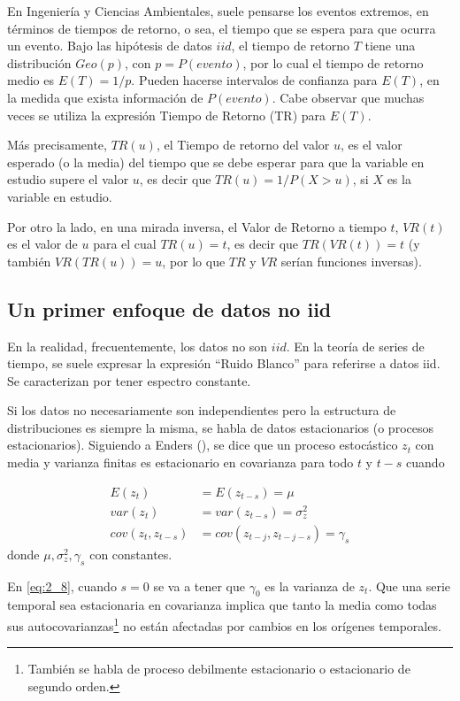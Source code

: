 \documentclass[
  12pt]{article}
\begin{document}
En Ingeniería y Ciencias Ambientales, suele pensarse los eventos
extremos, en términos de tiempos de retorno, o sea, el tiempo que se
espera para que ocurra un evento. Bajo las hipótesis de datos \(iid\),
el tiempo de retorno \(T\) tiene una distribución \(Geo(p)\), con
\(p = P(evento)\), por lo cual el tiempo de retorno medio es
\(E(T)=1/p\). Pueden hacerse intervalos de confianza para \(E(T)\), en
la medida que exista información de \(P(evento)\). Cabe observar que
muchas veces se utiliza la expresión Tiempo de Retorno (TR) para
\(E(T)\).

Más precisamente, \(TR(u)\), el Tiempo de retorno del valor \(u\), es el
valor esperado (o la media) del tiempo que se debe esperar para que la
variable en estudio supere el valor \(u\), es decir que
\(TR(u) = 1/P(X>u)\), si \(X\) es la variable en estudio.

Por otro la lado, en una mirada inversa, el Valor de Retorno a tiempo
\(t\), \(VR(t)\) es el valor de \(u\) para el cual \(TR(u)=t\), es decir
que \(TR(VR(t))=t\) (y también \(VR(TR(u))=u\), por lo que \(TR\) y
\(VR\) serían funciones inversas).

\subsection{Un primer enfoque de datos no
iid}\label{un-primer-enfoque-de-datos-no-iid}

En la realidad, frecuentemente, los datos no son \(iid\). En la teoría
de series de tiempo, se suele expresar la expresión ``Ruido Blanco''
para referirse a datos iid. Se caracterizan por tener espectro
constante.

Si los datos no necesariamente son independientes pero la estructura de
distribuciones es siempre la misma, se habla de datos estacionarios (o
procesos estacionarios). Siguiendo a Enders
(), se dice que un proceso estocástico
\(z_{t}\) con media y varianza finitas es estacionario en covarianza
para todo \(t\) y \(t-s\) cuando

\begin{align}
    \label{eq:2_7}
    E(z_{t})&=E(z_{t-s})=\mu\\
    \label{eq:2_8}
    var(z_t)&=var(z_{t-s})=\sigma^2_z\\
    \label{eq:2_9}
    cov(z_t,z_{t-s})&=cov(z_{t-j},z_{t-j-s})=\gamma_s
\end{align} donde \(\mu, \sigma^2_z, \gamma_s\) con constantes.

En \eqref{eq:2_8}, cuando \(s=0\) se va a tener que \(\gamma_0\) es la
varianza de \(z_t\). Que una serie temporal sea estacionaria en
covarianza implica que tanto la media como todas sus
autocovarianzas\footnote{También se habla de proceso debilmente estacionario o estacionario de segundo orden.}
no están afectadas por cambios en los orígenes temporales.
\end{document}
